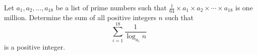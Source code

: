 Let $a_1,a_2,\ldots,a_{18}$ be a list of prime numbers such that $\frac{1}{64}\times a_1\times a_2\times\cdots\times a_{18}$ is one million. Determine the sum of all positive integers $n$ such that $$\sum_{i=1}^{18}\frac{1}{\log_{a_i}n}$$ is a positive integer.